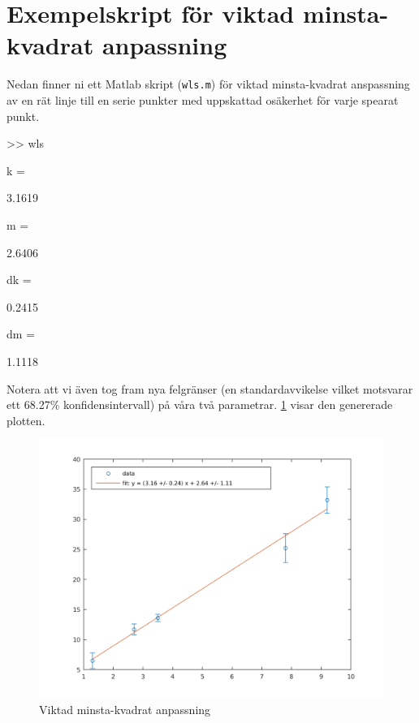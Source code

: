 \section{Exempelskript för viktad minsta-kvadrat anpassning}
\label{sec:matlab-wls}
Nedan finner ni ett Matlab skript ({\tt wls.m}) för viktad
minsta-kvadrat anspassning av en rät linje till en serie punkter med
uppskattad osäkerhet för varje spearat punkt.


\begin{terminaloutput}
>> wls

k =

    3.1619


m =

    2.6406


dk =

    0.2415


dm =

    1.1118
\end{terminaloutput}

Notera att vi även tog fram nya felgränser (en standardavvikelse vilket
motsvarar ett 68.27\% konfidensintervall) på våra två
parametrar. \cref{fig:matlab-wls} visar den genererade plotten.

\begin{figure}
  \centering
  \includegraphics[scale=0.5]{matlab/wls_fit.png}
  \caption{Viktad minsta-kvadrat anpassning}
  \label{fig:matlab-wls}
\end{figure}


